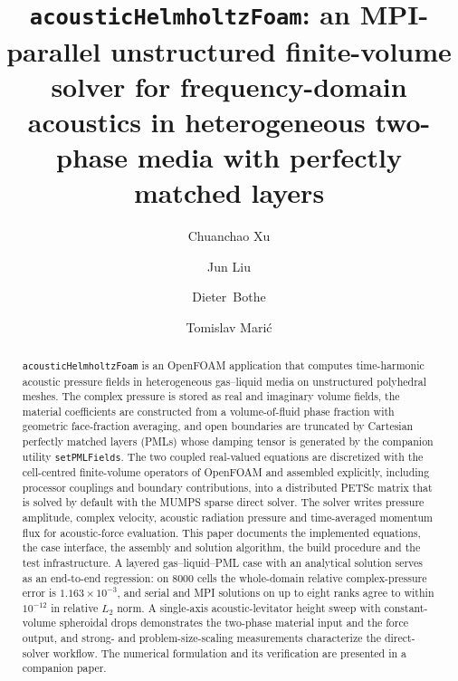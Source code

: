 \documentclass[final,12pt,nopreprintline]{elsarticle}
\newcommand{\code}[1]{\texttt{#1}}
\begin{document}
\begin{frontmatter}

\title{\texttt{acousticHelmholtzFoam}: an MPI-parallel unstructured
finite-volume solver for frequency-domain acoustics in heterogeneous two-phase
media with perfectly matched layers}

\author[mma]{Chuanchao Xu}
\author[mma]{Jun Liu}
\author[mma]{Dieter~Bothe}
\author[mma]{Tomislav Mari\'{c}\texorpdfstring{}{}}


\begin{abstract}
\code{acousticHelmholtzFoam} is an OpenFOAM application that computes
time-harmonic acoustic pressure fields in heterogeneous gas--liquid media on
unstructured polyhedral meshes.  The complex pressure is stored as real and
imaginary volume fields, the material coefficients are constructed from a
volume-of-fluid phase fraction with geometric face-fraction averaging, and open
boundaries are truncated by Cartesian perfectly matched layers (PMLs) whose
damping tensor is generated by the companion utility \code{setPMLFields}.  The
two coupled real-valued equations are discretized with the cell-centred
finite-volume operators of OpenFOAM and assembled explicitly, including
processor couplings and boundary contributions, into a distributed PETSc matrix
that is solved by default with the MUMPS sparse direct solver.  The solver
writes pressure amplitude, complex velocity, acoustic radiation pressure and
time-averaged momentum flux for acoustic-force evaluation.  This paper documents
the implemented equations, the case interface, the assembly and solution
algorithm, the build procedure and the test infrastructure.  A layered
gas--liquid--PML case with an analytical solution serves as an end-to-end
regression: on 8000 cells the whole-domain relative complex-pressure error is
$1.163\times10^{-3}$, and serial and MPI solutions on up to eight ranks agree
to within $10^{-12}$ in relative $L_2$ norm.  A single-axis
acoustic-levitator height sweep with constant-volume
spheroidal drops demonstrates the two-phase material input and the force output,
and strong- and problem-size-scaling measurements characterize the
direct-solver workflow.  The numerical formulation and its verification are
presented in a companion paper.


\end{abstract}
\end{frontmatter}
\end{document}
